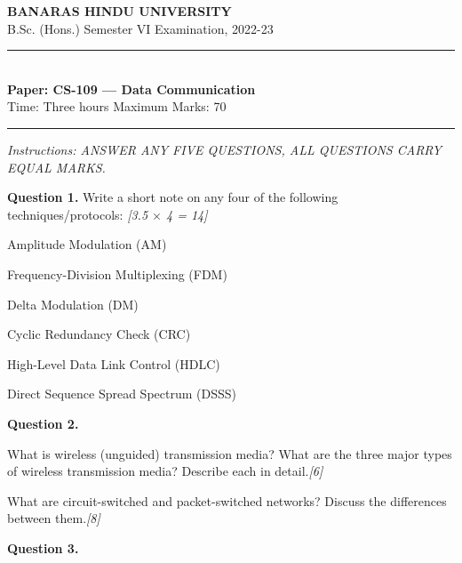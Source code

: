 \documentclass[11pt,a4paper]{article}
\newcommand{\pts}[1]{\hfill   \textit{[#1]}}
\begin{document}
\begin{center}
  {\large\bfseries BANARAS HINDU UNIVERSITY}\\[2pt]
  {\normalsize B.Sc. (Hons.) Semester VI Examination, 2022-23}\\[6pt]
  \rule{0.8\linewidth}{0.5pt}\\[6pt]
  {\large\bfseries Paper: CS-109 --- Data Communication}\\[4pt]
  {\normalsize Time: Three hours \hfill Maximum Marks: 70}
\end{center}

\rule{\linewidth}{0.4pt}

\smallskip



\noindent   \textit{Instructions: ANSWER ANY FIVE QUESTIONS, ALL QUESTIONS CARRY EQUAL MARKS.}

\bigskip

\medskip


\noindent   \textbf{Question 1.} Write a short note on any four of the following techniques/protocols: \pts{3.5 $ \times$ 4 = 14}

\begin{parts}
  \item Amplitude Modulation (AM)
  \item Frequency-Division Multiplexing (FDM)
  \item Delta Modulation (DM)
  \item Cyclic Redundancy Check (CRC)
  \item High-Level Data Link Control (HDLC)
  \item Direct Sequence Spread Spectrum (DSSS)
\end{parts}

\medskip


\noindent   \textbf{Question 2.}

\begin{parts}
  \item What is wireless (unguided) transmission media? What are the three major types of wireless transmission media? Describe each in detail.\pts{6}
  \item What are circuit-switched and packet-switched networks? Discuss the differences between them.\pts{8}
\end{parts}

\medskip


\noindent   \textbf{Question 3.}
\end{document}
